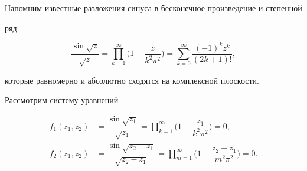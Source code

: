 




Напомним известные разложения синуса в бесконечное произведение и степенной


ряд:


$$


\frac{\sin\sqrt z}{\sqrt z}=\prod_{k=1}^\infty


\bigg(1-\frac z{k^2\pi^2}\bigg)=


\sum_{k=0}^\infty \frac{(-1)^kz^k}{(2k+1)!},


$$


которые равномерно и абсолютно сходятся на комплексной плоскости.





Рассмотрим систему уравнений


\begin{equation}\label{f14}


\begin{split}


f_1(z_1,z_2)&=\dfrac{\sin\sqrt{z_1}}{\sqrt{z_1}}=


\prod\limits_{k=1}^\infty\bigg(1-\dfrac{z_1}{k^2\pi^2}\bigg)=0,\\


f_2(z_1,z_2)&=\dfrac{\sin\sqrt{z_2-z_1}}{\sqrt{z_2-z_1}}=


\prod\limits_{m=1}^\infty\bigg(


1-\dfrac{z_2-z_1}{m^2\pi^2}\bigg)=0. \end{split}


\end{equation}





